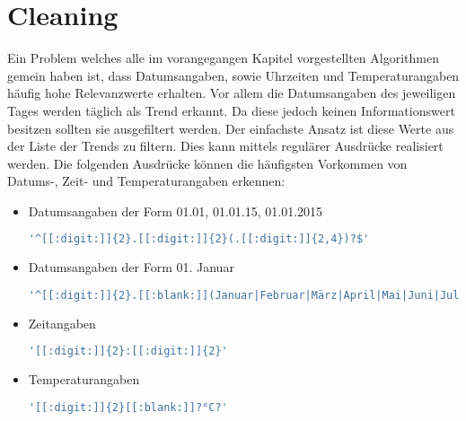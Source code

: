 \chapter{Cleaning}\label{cleaning}

Ein Problem welches alle im vorangegangen Kapitel vorgestellten Algorithmen gemein haben ist, dass Datumsangaben, sowie Uhrzeiten und Temperaturangaben häufig hohe Relevanzwerte erhalten. Vor allem die Datumsangaben des jeweiligen Tages werden täglich als Trend erkannt. Da diese jedoch keinen Informationswert besitzen sollten sie ausgefiltert werden. Der einfachste Ansatz ist diese Werte aus der Liste der Trends zu filtern. Dies kann mittels regulärer Ausdrücke realisiert werden. Die folgenden Ausdrücke können die häufigsten Vorkommen von Datums-, Zeit- und Temperaturangaben erkennen:

\begin{itemize}
	\item{Datumsangaben der Form 01.01, 01.01.15, 01.01.2015}\\
	\begin{lstlisting}[language=sql]
'^[[:digit:]]{2}.[[:digit:]]{2}(.[[:digit:]]{2,4})?$'
	\end{lstlisting}
\end{itemize}

\begin{itemize}
	\item{Datumsangaben der Form 01. Januar}\\
	\begin{lstlisting}[language=sql]
'^[[:digit:]]{2}.[[:blank:]](Januar|Februar|März|April|Mai|Juni|Juli|August|September|Oktober|November|Dezember)$'
	\end{lstlisting}
\end{itemize}

\begin{itemize}
	\item{Zeitangaben}\\
	\begin{lstlisting}[language=sql]
'[[:digit:]]{2}:[[:digit:]]{2}'
	\end{lstlisting}
\end{itemize}

\begin{itemize}
	\item{Temperaturangaben}\\
	\begin{lstlisting}[language=sql]
'[[:digit:]]{2}[[:blank:]]?°C?'
	\end{lstlisting}
\end{itemize}

